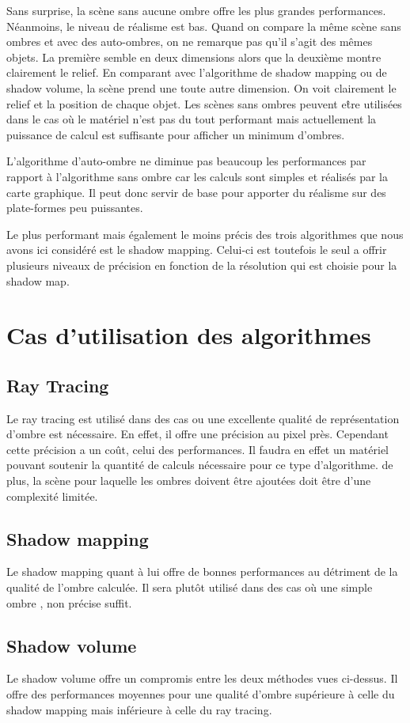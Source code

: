\documentclass[a4paper,10pt]{report}
\begin{document}
Sans surprise, la scène sans aucune ombre offre les plus grandes performances. Néanmoins, le niveau de réalisme est bas. Quand on compare la même scène sans ombres et avec des auto-ombres, on ne remarque pas qu'il s'agit des mêmes objets. La première semble en deux dimensions alors que la deuxième montre clairement le relief. En comparant avec l'algorithme de shadow mapping ou de shadow volume, la scène prend une toute autre dimension. On voit clairement le relief et la position de chaque objet.
Les scènes sans ombres peuvent e\^tre utilisées dans le cas où le matériel n'est pas du tout performant mais actuellement la puissance de calcul est suffisante pour afficher un minimum d'ombres.

L'algorithme d'auto-ombre ne diminue pas beaucoup les performances par rapport à l'algorithme sans ombre car les calculs sont simples et réalisés par la carte graphique. Il peut donc servir de base pour apporter du réalisme sur des plate-formes peu puissantes.

Le plus performant mais également le moins précis des trois algorithmes que nous avons ici considéré est le shadow mapping. Celui-ci est toutefois le seul a offrir plusieurs niveaux de précision en fonction de la résolution qui est choisie pour la shadow map.


\section{Cas d'utilisation des algorithmes}
\subsection{Ray Tracing}
Le ray tracing est utilisé dans des cas ou une excellente qualité de représentation d'ombre est nécessaire. En effet, il offre une précision au pixel près. Cependant cette précision a un coût, celui des performances. Il faudra en effet un matériel pouvant soutenir la quantité de calculs nécessaire pour ce type d'algorithme. de plus, la scène pour laquelle les ombres doivent être ajoutées doit être d'une complexité limitée.
\subsection{Shadow mapping}
Le shadow mapping quant à lui offre de bonnes performances au détriment de la qualité de l'ombre calculée. Il sera plutôt utilisé dans des cas où une simple ombre , non précise suffit.
\subsection{Shadow volume}
Le shadow volume offre un compromis entre les deux méthodes vues ci-dessus. Il offre des performances moyennes pour une qualité d'ombre supérieure à celle du shadow mapping mais inférieure à celle du ray tracing. 
\end{document}
